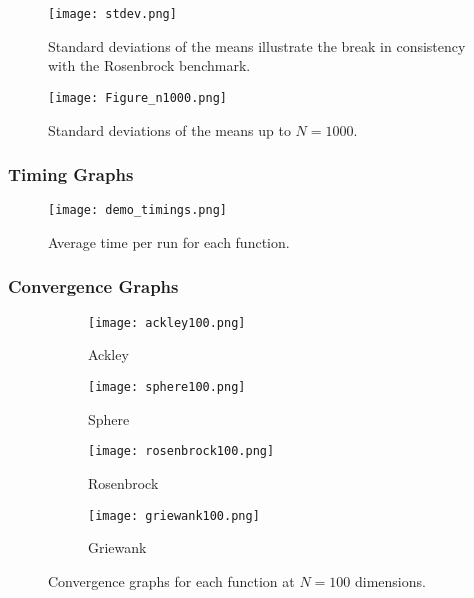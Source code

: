 \documentclass[KomodoMain.tex]{subfiles}
\begin{document}
\newpage

\begin{figure}[!htbp]
\caption{Standard deviations of the means illustrate the break in consistency with the Rosenbrock benchmark.}
\centering
\texttt{[image: stdev.png]}
\end{figure}

\begin{figure}[!htbp]
\caption{Standard deviations of the means up to $N = 1000$.}
\centering
\texttt{[image: Figure\_n1000.png]}
\end{figure}

\newpage

\subsubsection{Timing Graphs}

\begin{figure}[!htbp]
\caption{Average time per run for each function.}
\centering
\texttt{[image: demo\_timings.png]}
\end{figure}

\newpage
\subsubsection{Convergence Graphs}

\begin{figure}[!htbp]
     \centering
     \begin{subfigure}[b]{0.4\textwidth}
         \centering
         \texttt{[image: ackley100.png]}
         \caption{Ackley}
         \label{fig:ackley}
     \end{subfigure}
     \hfill
     \begin{subfigure}[b]{0.4\textwidth}
         \centering
         \texttt{[image: sphere100.png]}
         \caption{Sphere}
         \label{fig:sphere}
     \end{subfigure}
     \hfill
     \begin{subfigure}[b]{0.4\textwidth}
         \centering
         \texttt{[image: rosenbrock100.png]}
         \caption{Rosenbrock}
         \label{fig:rosenbrock}
     \end{subfigure}
     \hfill
     \begin{subfigure}[b]{0.4\textwidth}
         \centering
         \texttt{[image: griewank100.png]}
         \caption{Griewank}
         \label{fig:griewank}
     \end{subfigure}
        \caption{Convergence graphs for each function at $N = 100$ dimensions.}
        \label{fig:four graphs}
\end{figure}
\end{document}
